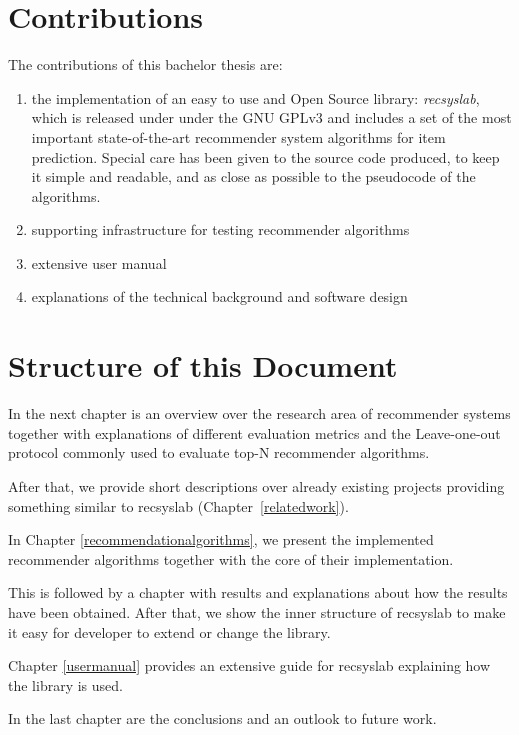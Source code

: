 \section{Contributions}
The contributions of this bachelor thesis are:
\begin{enumerate}
    \item the implementation of an easy to use and Open Source library: \textit{recsyslab}, which is released under under the GNU GPLv3\cite{gpl} and includes a set of the most important state-of-the-art recommender system algorithms for item prediction. Special care has been given to the source code produced, to keep it simple and readable, and as close as possible to the pseudocode of the algorithms.
    \item supporting infrastructure for testing recommender algorithms
    \item extensive user manual
    \item explanations of the technical background and software design
\end{enumerate}


\section{Structure of this Document}
In the next chapter is an overview over the research area of recommender systems
together with explanations of different evaluation metrics and the Leave-one-out
protocol commonly used to evaluate top-N recommender algorithms.

After that, we provide short descriptions over already existing 
projects providing something similar to recsyslab (Chapter~\ref{relatedwork}).

In Chapter \ref{recommendationalgorithms}, we present the implemented recommender
algorithms together with the core of their implementation. 

This is followed by a chapter with results and explanations about how the
results have been obtained. After that, we show the inner structure of recsyslab
to make it easy for developer to extend or change the library.

Chapter \ref{usermanual} provides an extensive guide for recsyslab explaining
how the library is used.

In the last chapter are the conclusions and an outlook to future work.
